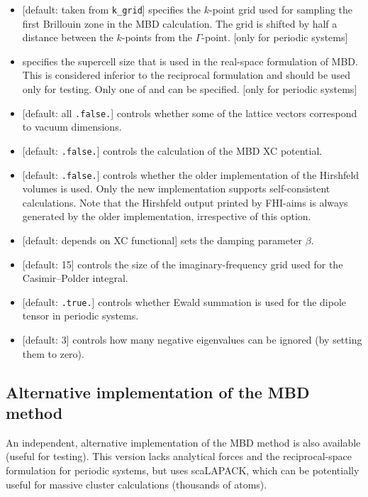 \begin{itemize}
  \item {} [default: taken from
    \texttt{k\_grid}] specifies the $k$-point grid used for sampling
  the first Brillouin zone in the MBD calculation. The grid is shifted
  by half a distance between the $k$-points from the
  $\Gamma$-point. [only for periodic systems] 
  \item {} specifies the supercell size that
  is used in the real-space formulation of MBD\@. This is considered
  inferior to the reciprocal formulation and should be used only for
  testing. Only one of  and  can be
  specified. [only for periodic systems] 
  \item {} [default: all \texttt{.false.}] controls
  whether some of the lattice vectors correspond to vacuum
  dimensions. 
  \item {} [default: \texttt{.false.}]
  controls the calculation of the MBD XC potential. 
  \item {} [default: \texttt{.false.}]
  controls whether the older implementation of the Hirshfeld volumes
  is used. Only the new implementation supports self-consistent
  calculations. Note that the Hirshfeld output printed by FHI-aims is
  always generated by the older implementation, irrespective of this
  option. 
  \item {} [default: depends on XC functional] sets the
  damping parameter $\beta$. 
  \item {} [default: 15] controls the size of
  the imaginary-frequency grid used for the Casimir--Polder integral. 
  \item {} [default: \texttt{.true.}] controls whether
  Ewald summation is used for the dipole tensor in periodic systems. 
  \item {} [default: 3]
  controls how many negative eigenvalues can be ignored (by setting them to zero).
\end{itemize}

\subsection*{Alternative implementation of the MBD method}

An independent, alternative implementation of the MBD method is also
available (useful for testing). This version lacks analytical forces
and the reciprocal-space formulation for periodic systems, but uses
scaLAPACK, which can be potentially useful for massive cluster
calculations (thousands of atoms). 


